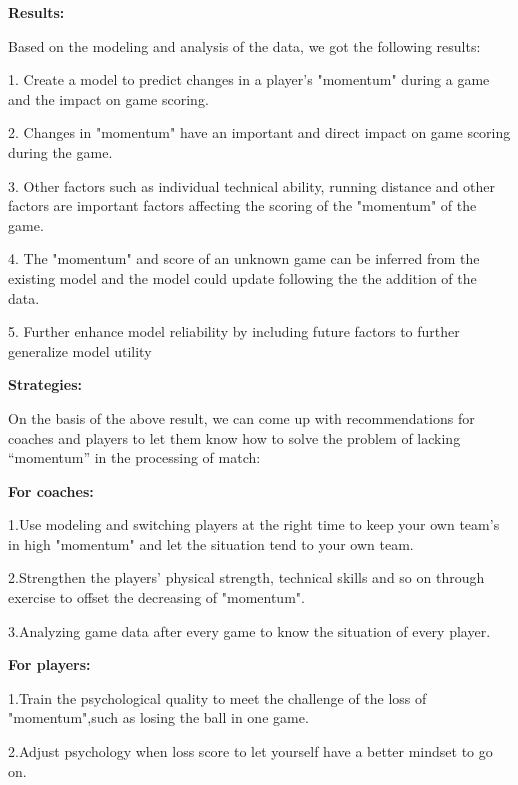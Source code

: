 \documentclass[12pt]{article}
\begin{document}
\begin{center}
      \textbf{Results:}
\end{center}

Based on the modeling and analysis of the data, we got the following results:

1. Create a model to predict changes in a player's "momentum" during a game and the impact on game scoring.

2. Changes in "momentum" have an important and direct impact on game scoring during the game.

3. Other factors such as individual technical ability, running distance and other factors are important factors affecting the scoring of the "momentum" of the game.

4. The "momentum" and score of an unknown game can be inferred from the existing model and the model could update following the the addition of the data.

5. Further enhance model reliability by including future factors to further generalize model utility

\begin{center}
      \textbf{Strategies:}
\end{center}

On the basis of the above result, we can come up with recommendations for coaches and players to let them know how to solve the problem of lacking “momentum” in the processing of match:

\begin{center}
      \textbf{For coaches:}
\end{center}

1.Use modeling and switching players at the right time to keep your own team's in high "momentum" and let the situation tend to your own team.

2.Strengthen the players' physical strength, technical skills and so on through exercise to offset the decreasing of "momentum".

3.Analyzing game data after every game to know the situation of every player.

\begin{center}
      \textbf{For players:}
\end{center}

1.Train the psychological quality to meet the challenge of the loss of "momentum",such as losing the ball in one game.

2.Adjust psychology when loss score to let yourself have a better mindset to go on.
\end{document}
